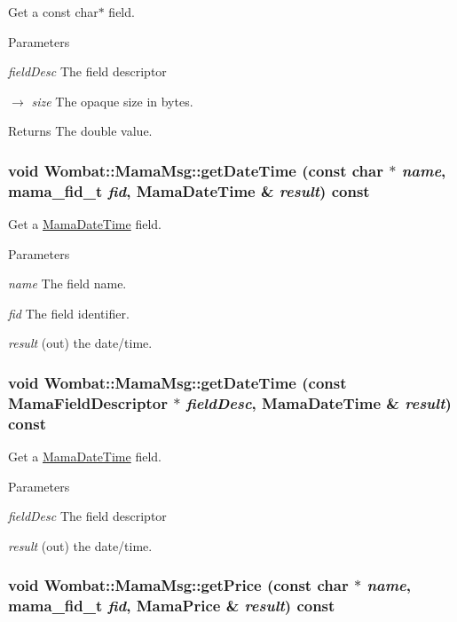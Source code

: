 Get a const char$\ast$ field. 
\begin{DoxyParams}{Parameters}
\item[{\em fieldDesc}]The field descriptor \item[\mbox{$\rightarrow$} {\em size}]The opaque size in bytes. \end{DoxyParams}
\begin{DoxyReturn}{Returns}
The double value. 
\end{DoxyReturn}
\hypertarget{classWombat_1_1MamaMsg_ae994e5b473cf646ea255b107c13978ec}{
\subsubsection[{getDateTime}]{\setlength{\rightskip}{0pt plus 5cm}void Wombat::MamaMsg::getDateTime (const char $\ast$ {\em name}, \/  mama\_\-fid\_\-t {\em fid}, \/  {\bf MamaDateTime} \& {\em result}) const}}
\label{classWombat_1_1MamaMsg_ae994e5b473cf646ea255b107c13978ec}


Get a \hyperlink{classWombat_1_1MamaDateTime}{MamaDateTime} field. 
\begin{DoxyParams}{Parameters}
\item[{\em name}]The field name. \item[{\em fid}]The field identifier. \item[{\em result}](out) the date/time. \end{DoxyParams}
\hypertarget{classWombat_1_1MamaMsg_ad4b8c8df53573e993d28b50b9628778d}{
\subsubsection[{getDateTime}]{\setlength{\rightskip}{0pt plus 5cm}void Wombat::MamaMsg::getDateTime (const {\bf MamaFieldDescriptor} $\ast$ {\em fieldDesc}, \/  {\bf MamaDateTime} \& {\em result}) const}}
\label{classWombat_1_1MamaMsg_ad4b8c8df53573e993d28b50b9628778d}


Get a \hyperlink{classWombat_1_1MamaDateTime}{MamaDateTime} field. 
\begin{DoxyParams}{Parameters}
\item[{\em fieldDesc}]The field descriptor \item[{\em result}](out) the date/time. \end{DoxyParams}
\hypertarget{classWombat_1_1MamaMsg_a75e26b3eead779cbf176a2866a873735}{
\subsubsection[{getPrice}]{\setlength{\rightskip}{0pt plus 5cm}void Wombat::MamaMsg::getPrice (const char $\ast$ {\em name}, \/  mama\_\-fid\_\-t {\em fid}, \/  {\bf MamaPrice} \& {\em result}) const}}
\label{classWombat_1_1MamaMsg_a75e26b3eead779cbf176a2866a873735}


